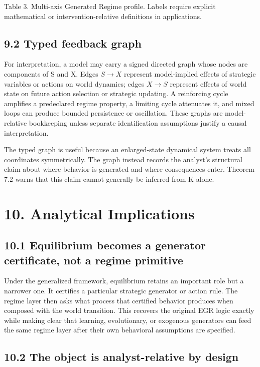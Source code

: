\documentclass[10pt]{article}
\begin{document}
Table 3. Multi-axis Generated Regime profile. Labels require explicit
mathematical or intervention-relative definitions in applications.

\subsection{9.2 Typed feedback graph}\label{typed-feedback-graph}

For interpretation, a model may carry a signed directed graph whose
nodes are components of S and X. Edges \(S\to{}X\) represent
model-implied effects of strategic variables or actions on world
dynamics; edges \(X\to{}S\) represent effects of world state on future
action selection or strategic updating. A reinforcing cycle amplifies a
predeclared regime property, a limiting cycle attenuates it, and mixed
loops can produce bounded persistence or oscillation. These graphs are
model-relative bookkeeping unless separate identification assumptions
justify a causal interpretation.

The typed graph is useful because an enlarged-state dynamical system
treats all coordinates symmetrically. The graph instead records the
analyst's structural claim about where behavior is generated and where
consequences enter. Theorem 7.2 warns that this claim cannot generally
be inferred from K alone.

\section{10. Analytical Implications}\label{analytical-implications}

\subsection{10.1 Equilibrium becomes a generator certificate, not a
regime
primitive}\label{equilibrium-becomes-a-generator-certificate-not-a-regime-primitive}

Under the generalized framework, equilibrium retains an important role
but a narrower one. It certifies a particular strategic generator or
action rule. The regime layer then asks what process that certified
behavior produces when composed with the world transition. This recovers
the original EGR logic exactly while making clear that learning,
evolutionary, or exogenous generators can feed the same regime layer
after their own behavioral assumptions are specified.

\subsection{10.2 The object is analyst-relative by
design}\label{the-object-is-analyst-relative-by-design}
\end{document}
